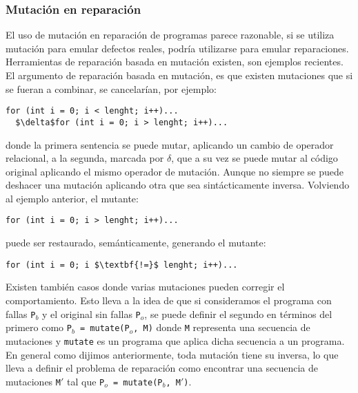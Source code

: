 \subsubsection{Mutaci\'on en reparaci\'on}
\label{sec:repair.granularity.mutation}

El uso de mutaci\'on en reparaci\'on de programas parece razonable, si se utiliza mutaci\'on para emular defectos reales, podr\'ia utilizarse para emular reparaciones. Herramientas de reparaci\'on basada en mutaci\'on existen, \cite{bibliography.repair.mutation.DebroyW10, bibliography.repair.mutation.AlloyWang18} son ejemplos recientes. El argumento de reparaci\'on basada en mutaci\'on, es que existen mutaciones que si se fueran a combinar, se cancelar\'ian, por ejemplo:
\begin{lstlisting}[mathescape=true]
  for (int i = 0; i < lenght; i++)...
  $\delta$for (int i = 0; i > lenght; i++)...
\end{lstlisting}
donde la primera sentencia se puede mutar, aplicando un cambio de operador relacional, a la segunda, marcada por $\delta$, que a su vez se puede mutar al c\'odigo original aplicando el mismo operador de mutaci\'on. Aunque no siempre se puede deshacer una mutaci\'on aplicando otra que sea sint\'acticamente inversa. 
Volviendo al ejemplo anterior, el mutante:
\begin{lstlisting}[mathescape=true]
  for (int i = 0; i > lenght; i++)...
\end{lstlisting}
puede ser restaurado, sem\'anticamente, generando el mutante:
\begin{lstlisting}[mathescape=true]
  for (int i = 0; i $\textbf{!=}$ lenght; i++)...
\end{lstlisting}
Existen tambi\'en casos donde varias mutaciones pueden corregir el comportamiento. Esto lleva a la idea de que si consideramos el programa con fallas \texttt{P$_b$} y el original sin fallas \texttt{P$_o$}, se puede definir el segundo en t\'erminos del primero como \texttt{P$_b$ = mutate(P$_o$, M)} donde \texttt{M} representa una secuencia de mutaciones y \texttt{mutate} es un programa que aplica dicha secuencia a un programa. En general como dijimos anteriormente, toda mutaci\'on tiene su inversa, lo que lleva a definir el problema de reparaci\'on como encontrar una secuencia de mutaciones \texttt{M$\prime$} tal que \texttt{P$_o$ = mutate(P$_b$, M$\prime$)}.

